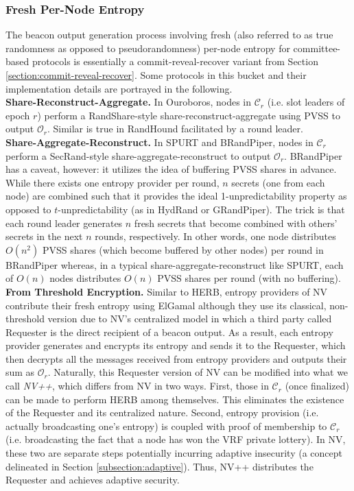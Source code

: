 \documentclass[letterpaper,twocolumn,10pt]{article}
\theoremstyle{definition}
\theoremstyle{remark}
\begin{document}
\subsubsection{Fresh Per-Node Entropy}
\label{subsubsection:fresh}
The beacon output generation process involving fresh (also referred to as true randomness \cite{cascudomt, das2021spurt} as opposed to pseudorandomness) per-node entropy for committee-based protocols is essentially a commit-reveal-recover variant from Section \ref{section:commit-reveal-recover}. Some protocols in this bucket and their implementation details are portrayed in the following.\\

\noindent\textbf{Share-Reconstruct-Aggregate.} In Ouroboros, nodes in $\mathcal{C}_r$ (i.e. slot leaders of epoch $r$) perform a RandShare-style share-reconstruct-aggregate using PVSS to output $\mathcal{O}_r$. Similar is true in RandHound facilitated by a round leader.\\

\noindent\textbf{Share-Aggregate-Reconstruct.} In SPURT and BRandPiper, nodes in $\mathcal{C}_r$ perform a SecRand-style share-aggregate-reconstruct to output $\mathcal{O}_r$. BRandPiper has a caveat, however: it utilizes the idea of buffering PVSS shares in advance. While there exists one entropy provider per round, $n$ secrets (one from each node) are combined such that it provides the ideal 1-unpredictability property as opposed to $t$-unpredictability (as in HydRand or GRandPiper). The trick is that each round leader generates $n$ fresh secrets that become combined with others' secrets in the next $n$ rounds, respectively. In other words, one node distributes $O(n^2)$ PVSS shares (which become buffered by other nodes) per round in BRandPiper whereas, in a typical share-aggregate-reconstruct like SPURT, each of $O(n)$ nodes distributes $O(n)$ PVSS shares per round (with no buffering).\\

\noindent\textbf{From Threshold Encryption.} Similar to HERB, entropy providers of NV \cite{nguyen2019scalable} contribute their fresh entropy using ElGamal although they use its classical, non-threshold version due to NV's centralized model in which a third party called Requester is the direct recipient of a beacon output. As a result, each entropy provider generates and encrypts its entropy and sends it to the Requester, which then decrypts all the messages received from entropy providers and outputs their sum as $\mathcal{O}_r$. Naturally, this Requester version of NV can be modified into what we call \textit{NV++}, which differs from NV in two ways. First, those in $\mathcal{C}_r$ (once finalized) can be made to perform HERB among themselves. This eliminates the existence of the Requester and its centralized nature. Second, entropy provision (i.e. actually broadcasting one's entropy) is coupled with proof of membership to $\mathcal{C}_r$ (i.e. broadcasting the fact that a node has won the VRF private lottery). In NV, these two are separate steps potentially incurring adaptive insecurity (a concept delineated in Section \ref{subsection:adaptive}). Thus, NV++ distributes the Requester and achieves adaptive security.
\end{document}
